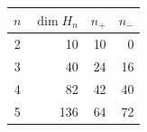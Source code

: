 \begin{tabular}{c|r|rr}
$n$ & $\dim H_n$ & $n_+$ & $n_-$ \\
\hline
2 & 10 & 10 & 0 \\
3 & 40 & 24 & 16 \\
4 & 82 & 42 & 40 \\
5 & 136 & 64 & 72 \\
\end{tabular}
